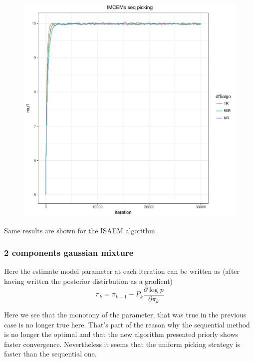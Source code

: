 \documentclass[a4paper]{article}
\theoremstyle{plain}
\theoremstyle{plain}
\theoremstyle{definition}
\begin{document}
\begin{figure}[H]
\begin{center}
\includegraphics[scale=0.5]{imcem.pdf}
\end{center}
\end{figure}

Same results are shown for the ISAEM algorithm.

\subsubsection{2 components gaussian mixture}
Here the estimate model parameter at each iteration can be written as (after having written the posterior distirbution as a gradient)
\begin{equation}
\pi_k = \pi_{k-1} - P_k \frac{\partial \log p}{\partial \pi_k}
\end{equation}

Here we see that the monotony of the parameter, that was true in the previous case is no longer true here.
That's part of the reason why the sequential method is no longer the optimal and that the new algorithm presented priorly shows faster convergence. Nevertheless it seems that the uniform picking strategy is faster than the sequential one.
\end{document}
